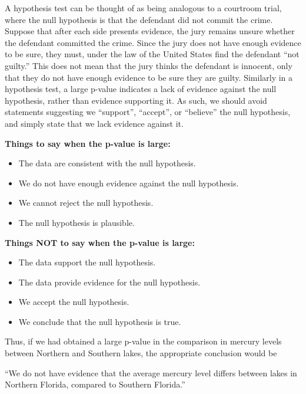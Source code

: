 \documentclass[
  letterpaper,
  DIV=11,
  numbers=noendperiod]{scrreprt}
\providecommand{\tightlist}{%
  \setlength{\itemsep}{0pt}\setlength{\parskip}{0pt}}\usepackage{longtable,booktabs,array}
\begin{document}
A hypothesis test can be thought of as being analogous to a courtroom
trial, where the null hypothesis is that the defendant did not commit
the crime. Suppose that after each side presents evidence, the jury
remains unsure whether the defendant committed the crime. Since the jury
does not have enough evidence to be sure, they must, under the law of
the United States find the defendant ``not guilty.'' This does not mean
that the jury thinks the defendant is innocent, only that they do not
have enough evidence to be sure they are guilty. Similarly in a
hypothesis test, a large p-value indicates a lack of evidence against
the null hypothesis, rather than evidence supporting it. As such, we
should avoid statements suggesting we ``support'', ``accept'', or
``believe'' the null hypothesis, and simply state that we lack evidence
against it.

\textbf{Things to say when the p-value is large:}

\begin{itemize}
\tightlist
\item
  The data are consistent with the null hypothesis.\\
\item
  We do not have enough evidence against the null hypothesis.\\
\item
  We cannot reject the null hypothesis.\\
\item
  The null hypothesis is plausible.
\end{itemize}

\textbf{Things NOT to say when the p-value is large:}

\begin{itemize}
\tightlist
\item
  The data support the null hypothesis.\\
\item
  The data provide evidence for the null hypothesis.\\
\item
  We accept the null hypothesis.\\
\item
  We conclude that the null hypothesis is true.
\end{itemize}

Thus, if we had obtained a large p-value in the comparison in mercury
levels between Northern and Southern lakes, the appropriate conclusion
would be

``We do not have evidence that the average mercury level differs between
lakes in Northern Florida, compared to Southern Florida.''
\end{document}

